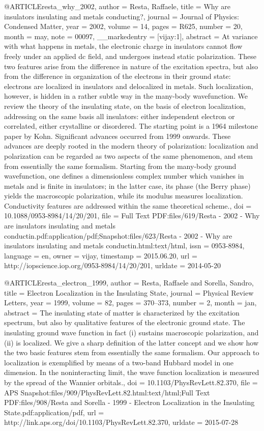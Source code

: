 @ARTICLE{resta_why_2002,
  author = {Resta, Raffaele},
  title = {Why are insulators insulating and metals conducting?},
  journal = {Journal of Physics: Condensed Matter},
  year = {2002},
  volume = {14},
  pages = {R625},
  number = {20},
  month = may,
  note = {00097},
  __markedentry = {[vijay:1]},
  abstract = {At variance with what happens in metals, the electronic charge in
	insulators cannot flow freely under an applied dc field, and undergoes
	instead static polarization. These two features arise from the difference
	in nature of the excitation spectra, but also from the difference
	in organization of the electrons in their ground state: electrons
	are localized in insulators and delocalized in metals. Such localization,
	however, is hidden in a rather subtle way in the many-body wavefunction.
	We review the theory of the insulating state, on the basis of electron
	localization, addressing on the same basis all insulators: either
	independent electron or correlated, either crystalline or disordered.
	The starting point is a 1964 milestone paper by Kohn. Significant
	advances occurred from 1999 onwards. These advances are deeply rooted
	in the modern theory of polarization: localization and polarization
	can be regarded as two aspects of the same phenomenon, and stem from
	essentially the same formalism. Starting from the many-body ground
	wavefunction, one defines a dimensionless complex number which vanishes
	in metals and is finite in insulators; in the latter case, its phase
	(the Berry phase) yields the macroscopic polarization, while its
	modulus measures localization. Conductivity features are addressed
	within the same theoretical scheme.},
  doi = {10.1088/0953-8984/14/20/201},
  file = {Full Text PDF:files/619/Resta - 2002 - Why are insulators insulating and metals conductin.pdf:application/pdf;Snapshot:files/623/Resta - 2002 - Why are insulators insulating and metals conductin.html:text/html},
  issn = {0953-8984},
  language = {en},
  owner = {vijay},
  timestamp = {2015.06.20},
  url = {http://iopscience.iop.org/0953-8984/14/20/201},
  urldate = {2014-05-20}
}

@ARTICLE{resta_electron_1999,
  author = {Resta, Raffaele and Sorella, Sandro},
  title = {Electron {Localization} in the {Insulating} {State}},
  journal = {Physical Review Letters},
  year = {1999},
  volume = {82},
  pages = {370--373},
  number = {2},
  month = jan,
  abstract = {The insulating state of matter is characterized by the excitation
	spectrum, but also by qualitative features of the electronic ground
	state. The insulating ground wave function in fact (i) sustains macroscopic
	polarization, and (ii) is localized. We give a sharp definition of
	the latter concept and we show how the two basic features stem from
	essentially the same formalism. Our approach to localization is exemplified
	by means of a two-band Hubbard model in one dimension. In the noninteracting
	limit, the wave function localization is measured by the spread of
	the Wannier orbitals.},
  doi = {10.1103/PhysRevLett.82.370},
  file = {APS Snapshot:files/909/PhysRevLett.82.html:text/html;Full Text PDF:files/908/Resta and Sorella - 1999 - Electron Localization in the Insulating State.pdf:application/pdf},
  url = {http://link.aps.org/doi/10.1103/PhysRevLett.82.370},
  urldate = {2015-07-28}
}

